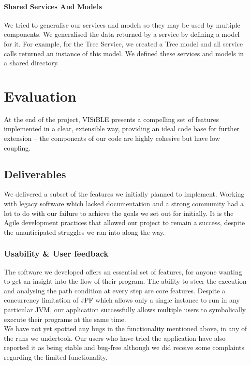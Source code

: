 \documentclass[titlepage,11pt]{article}
\begin{document}
\paragraph{Shared Services And Models}

\noindent We tried to generalise our services and models so they may be used by multiple components. We generalised the data returned by a service by defining a model for it. For example, for the Tree Service, we created a Tree model and all service calls returned an instance of this model. We defined these services and models in a shared directory.

\section{Evaluation}

At the end of the project, VISiBLE presents a compelling set of features implemented in a clear, extensible way, providing an ideal code base for further extension -- the components of our code are highly cohesive but have low coupling.

\subsection{Deliverables}

We delivered a subset of the features we initially planned to implement. Working with legacy software which lacked documentation and a strong community had a lot to do with our failure to achieve the goals we set out for initially. It is the Agile development practices that allowed our project to remain a success, despite the unanticipated struggles we ran into along the way.

\subsubsection{Usability \& User feedback}

The software we developed offers an essential set of features, for anyone wanting to get an insight into the flow of their program. The ability to steer the execution and analysing the path condition at every step are core features. Despite a concurrency limitation of JPF which allows only a single instance to run in any particular JVM, our application successfully allows multiple users to symbolically execute their programs at the same time. \\

\noindent We have not yet spotted any bugs in the functionality mentioned above, in any of the runs we undertook. Our users who have tried the application have also reported it as being stable and bug-free although we did receive some complaints regarding the limited functionality. \\
\end{document}
